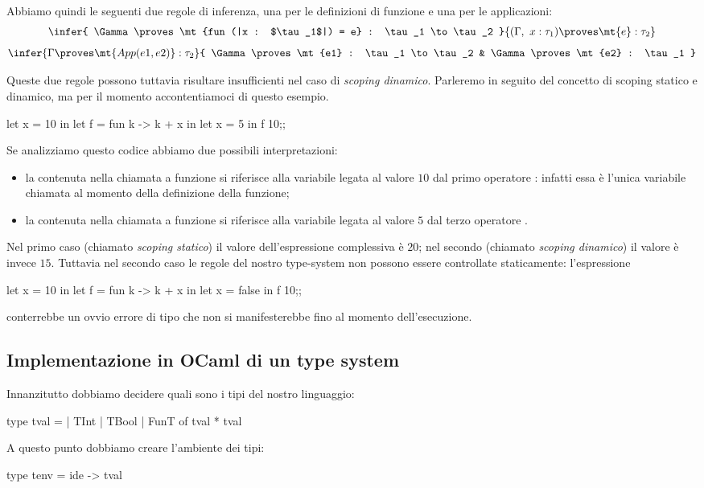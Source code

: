 Abbiamo quindi le seguenti due regole di inferenza, una per le definizioni di funzione e una per le applicazioni:
\begin{gather*}
    \infer{
        \Gamma \proves \mt{fun (|x : $\tau_1$|) = e} : \tau_1 \to \tau_2
    }{
        (\Gamma,\ x : \tau_1) \proves \mt{e} : \tau_2
    }\\[5pt]
    \infer{
        \Gamma \proves \mt{App(e1, e2)} : \tau_2
    }{
        \Gamma \proves \mt{e1} : \tau_1 \to \tau_2 &
        \Gamma \proves \mt{e2} : \tau_1
    }
\end{gather*}

Queste due regole possono tuttavia risultare insufficienti nel caso di \emph{scoping dinamico}.
Parleremo in seguito del concetto di scoping statico e dinamico, ma per il momento accontentiamoci di questo esempio.

\begin{OCaml}
    let x = 10 in
    let f = fun k -> k + x in
    let x = 5 in
        f 10;;
\end{OCaml}

Se analizziamo questo codice abbiamo due possibili interpretazioni:
\begin{itemize}
    \item la  contenuta nella chiamata a funzione  si riferisce alla variabile  legata al valore $10$ dal primo operatore : infatti essa è l'unica variabile chiamata  al momento della definizione della funzione;
    \item la  contenuta nella chiamata a funzione  si riferisce alla variabile  legata al valore $5$ dal terzo operatore .
\end{itemize}

Nel primo caso (chiamato \emph{scoping statico}) il valore dell'espressione complessiva è $20$; nel secondo (chiamato \emph{scoping dinamico}) il valore è invece $15$. Tuttavia nel secondo caso le regole del nostro type-system non possono essere controllate staticamente: l'espressione \begin{OCaml}
    let x = 10 in
    let f = fun k -> k + x in
    let x = false in
        f 10;;
\end{OCaml}
conterrebbe un ovvio errore di tipo che non si manifesterebbe fino al momento dell'esecuzione.

\subsection{Implementazione in OCaml di un type system}
Innanzitutto dobbiamo decidere quali sono i tipi del nostro linguaggio:
\begin{OCaml}
    type tval =
        | TInt
        | TBool
        | FunT of tval * tval
\end{OCaml}
A questo punto dobbiamo creare l'ambiente dei tipi:
\begin{OCaml}
    type tenv = ide -> tval
\end{OCaml}

